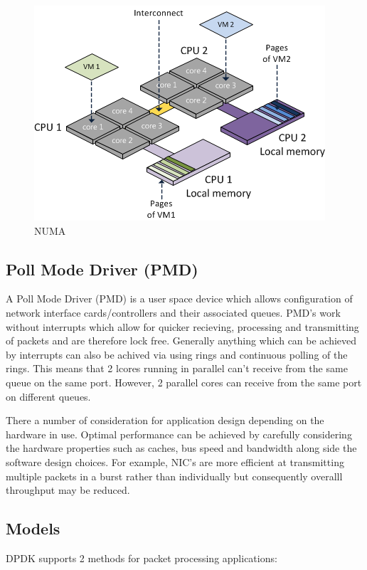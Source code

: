 \documentclass[final_report.tex]{subfiles}
\begin{document}
\begin{figure}[H]
	\centering
	\includegraphics[width=\textwidth/2]{img/numa.png}
	\caption{NUMA}
	\label{fig:numa}
\end{figure}

\subsection{Poll Mode Driver (PMD)}
A Poll Mode Driver (PMD) is a user space device which allows configuration of network interface cards/controllers and their associated queues. PMD's work without interrupts which allow for quicker recieving, processing and transmitting of packets and are therefore lock free. Generally anything which can be achieved by interrupts can also be achived via using rings and continuous polling of the rings. This means that 2 lcores running in parallel can't receive from the same queue on the same port. However, 2 parallel cores can receive from the same port on different queues.

There a number of consideration for application design depending on the hardware in use. Optimal performance can be achieved by carefully considering the hardware properties such as caches, bus speed and bandwidth along side the software design choices. For example, NIC's are more efficient at transmitting multiple packets in a burst rather than individually but consequently overalll throughput may be reduced.

\subsection{Models}
DPDK supports 2 methods for packet processing applications:
\end{document}
